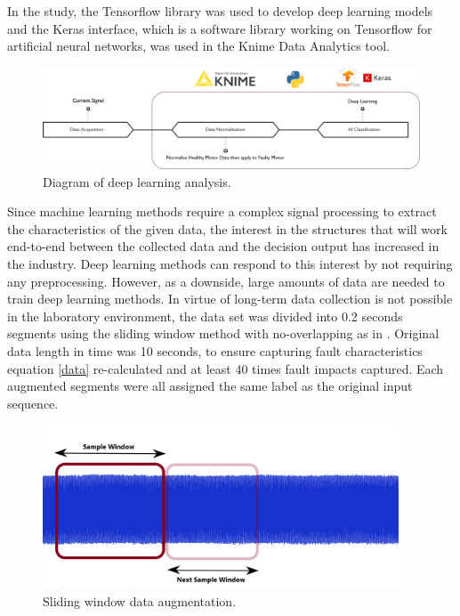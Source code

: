 In the study, the Tensorflow library was used to develop deep learning models and the Keras interface, which is a software library working on Tensorflow for artificial neural networks, was used in the Knime Data Analytics tool.

\begin{figure}[h]
	\centering
	\includegraphics[width=400pt,keepaspectratio=true]{./fig/method4.PNG}
	\caption{Diagram of deep learning analysis.}	
	\label{method4}
\end{figure}

Since machine learning methods require a complex signal processing to extract the characteristics of the given data, the interest in the structures that will work end-to-end between the collected data and the decision output has increased in the industry. Deep learning methods can respond to this interest by not requiring any preprocessing. However, as a downside, large amounts of data are needed to train deep learning methods. In virtue of long-term data collection is not possible in the laboratory environment, the data set was divided into 0.2 seconds segments using the sliding window method with no-overlapping as in \cite{shenfield2020novel}. Original data length in time was 10 seconds, to ensure capturing fault characteristics equation \ref{data} re-calculated and at least 40 times fault impacts captured. Each augmented segments were all assigned the same label as the original input sequence.

\begin{figure}[h]
	\centering
	\includegraphics[width=300pt,keepaspectratio=true]{./fig/data.png}
	\caption{Sliding window data augmentation.}	
	\label{dataslide}
\end{figure}

